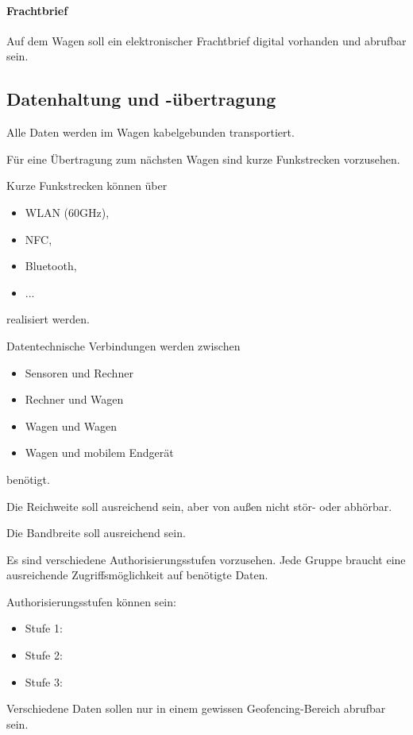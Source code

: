 \paragraph{Frachtbrief}
\begin{feat}
Auf dem Wagen soll ein elektronischer Frachtbrief digital vorhanden und abrufbar sein.
\end{feat}

\subsection{Datenhaltung und -übertragung}
\begin{feat}
Alle Daten werden im Wagen kabelgebunden transportiert. 
\end{feat}
\begin{feat}
Für eine Übertragung zum nächsten Wagen sind kurze Funkstrecken vorzusehen.
\end{feat}
\begin{rem}[zu Anf. 35]
Kurze Funkstrecken können über
\begin{itemize}
    \item WLAN (60GHz),
    \item NFC,
    \item Bluetooth,
    \item ...
\end{itemize}
realisiert werden.
\end{rem}
\begin{feat}
Datentechnische Verbindungen werden zwischen 
\begin{itemize}
    \item Sensoren und Rechner
    \item Rechner und Wagen
    \item Wagen und Wagen
    \item Wagen und mobilem Endgerät
\end{itemize}
benötigt.
\end{feat}
\begin{feat}
Die Reichweite soll ausreichend sein, aber von außen nicht stör- oder abhörbar.
\end{feat}
\begin{feat}
Die Bandbreite soll ausreichend sein.
\end{feat}
\begin{feat}
Es sind verschiedene Authorisierungsstufen vorzusehen. Jede Gruppe braucht eine ausreichende Zugriffsmöglichkeit auf benötigte Daten.
\end{feat}
\begin{rem} [zu Anf. 39]
Authorisierungsstufen können sein:
\begin{itemize}
    \item Stufe 1:
    \item Stufe 2:
    \item Stufe 3:
\end{itemize}
\end{rem}
\begin{rem} [zu Anf. 39]
Verschiedene Daten sollen nur in einem gewissen Geofencing-Bereich abrufbar sein.
\end{rem}

